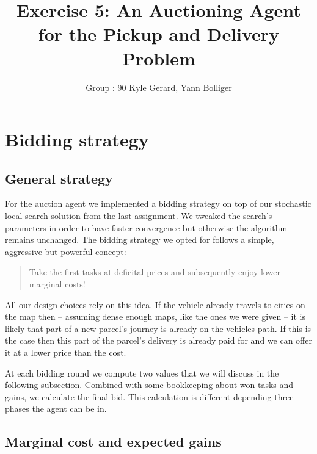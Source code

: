 \documentclass[11pt]{article}
\title{\bf Exercise 5: An Auctioning Agent for the Pickup and Delivery Problem}
\author{Group \textnumero : 90  Kyle Gerard, Yann Bolliger}
\begin{document}
\maketitle

\section{Bidding strategy}

% 
% 

\subsection{General strategy} 

For the auction agent we implemented a bidding strategy on top of our stochastic
local search solution from the last assignment. We tweaked the search's
parameters in order to have faster convergence but otherwise the algorithm
remains unchanged. The bidding strategy we opted for follows a simple,
aggressive but powerful concept: 

\begin{quotation}
Take the first tasks at deficital prices and subsequently enjoy lower marginal 
costs!
\end{quotation}

All our design choices rely on this idea. If the vehicle already travels to
cities on the map then -- assuming dense enough maps, like the ones we were
given -- it is likely that part of a new parcel's journey is already on the
vehicles path. If this is the case then this part of the parcel's delivery is
already paid for and we can offer it at a lower price than the cost.

At each bidding round we compute two values that we will discuss in the
following subsection. Combined with some bookkeeping about won tasks and gains,
we calculate the final bid. This calculation is different depending three phases 
the agent can be in.


\subsection{Marginal cost and expected gains}
\end{document}
